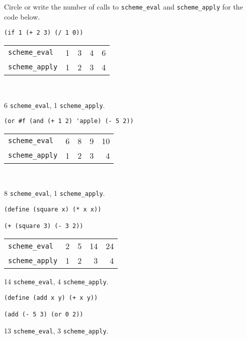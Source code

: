\begin{blocksection}
\question Circle or write the number of calls to \lstinline$scheme_eval$ and
\lstinline$scheme_apply$ for the code below.

\begin{lstlisting}
(if 1 (+ 2 3) (/ 1 0))
\end{lstlisting}

\begin{tabular}{lrrrr}
\lstinline$scheme_eval$ & 1 & 3 & 4 & 6 \\
\lstinline$scheme_apply$ & 1 & 2 & 3 & 4
\end{tabular}
\\

\begin{solution}
6 \lstinline$scheme_eval$, 1 \lstinline$scheme_apply$.
\end{solution}

\vspace{2\baselineskip}
\begin{lstlisting}
(or #f (and (+ 1 2) 'apple) (- 5 2))
\end{lstlisting}

\begin{tabular}{lrrrr}
\lstinline$scheme_eval$ & 6 & 8 & 9 & 10 \\
\lstinline$scheme_apply$ & 1 & 2 & 3 & 4
\end{tabular}
\\

\begin{solution}
8 \lstinline$scheme_eval$, 1 \lstinline$scheme_apply$.
\end{solution}

\vspace{2\baselineskip}
\begin{lstlisting}
(define (square x) (* x x))

(+ (square 3) (- 3 2))
\end{lstlisting}

\begin{tabular}{lrrrr}
\lstinline$scheme_eval$ & 2 & 5 & 14 & 24 \\
\lstinline$scheme_apply$ & 1 & 2 & 3 & 4
\end{tabular}

\begin{solution}
14 \lstinline$scheme_eval$, 4 \lstinline$scheme_apply$.
\end{solution}

\vspace{2\baselineskip}
\begin{lstlisting}
(define (add x y) (+ x y))

(add (- 5 3) (or 0 2))
\end{lstlisting}

\begin{solution}[1in]
13 \lstinline$scheme_eval$, 3 \lstinline$scheme_apply$.
\end{solution}

\end{blocksection}


